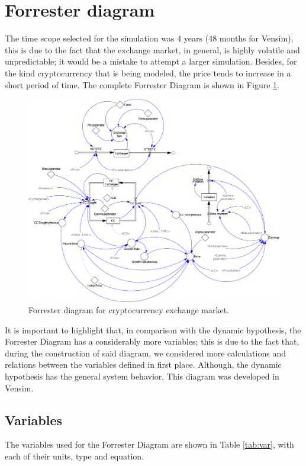 \pagebreak
\section{Forrester diagram}
The time scope selected for the simulation was 4 years (48 months for Vensim), this is due to the fact that the exchange market, in general, is highly volatile and unpredictable; it would be a mistake to attempt a larger simulation. Besides, for the kind cryptocurrency that is being modeled, the price tends to increase in a short period of time. The complete Forrester Diagram is shown in Figure \ref{img:forrester}.
\begin{figure}[H]
	\centering
    \includegraphics[scale=0.6]{files/ForresterDiag.pdf}
    \caption{Forrester diagram for cryptocurrency exchange market.}
    \label{img:forrester}
\end{figure}

It is important to highlight that, in comparison with the dynamic hypothesis, the Forrester Diagram has a considerably more variables; this is due to the fact that, during the construction of said diagram, we considered more calculations and relations between the variables defined in first place. Although, the dynamic hypothesis has the general system behavior. This diagram was developed in Vensim.
\pagebreak
\subsection{Variables}
	The variables used for the Forrester Diagram are shown in Table \ref{tab:var}, with each of their units, type and equation.\vspace{1.25cm}

